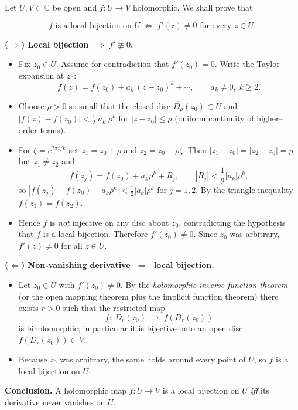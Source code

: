 \documentclass[12pt]{article}
\newcommand{\C}{\mathbb{C}}
\begin{document}
\begin{newproof}
  Let $U,V \subset \C$ be open and $f:U\to V$ holomorphic.  
  We shall prove that  

  $$
     f \text{ is a local bijection on }U 
     \;\Longleftrightarrow\;
     f'(z)\neq0 \text{ for every }z\in U .
  $$

  \smallskip
  \textbf{($\Rightarrow$)  Local bijection $\;\Longrightarrow\; f'\not\equiv0$.}

  \begin{itemize}
    \item Fix $z_0\in U$.  
          Assume for contradiction that $f'(z_0)=0$.  
          Write the Taylor expansion at $z_0$:
          $$
            f(z)=f(z_0)+a_k\,(z-z_0)^k+\cdots ,
            \qquad 
            a_k\neq0,\; k\ge2 .
          $$
    \item Choose $\rho>0$ so small that the closed disc
          $\overline{D_\rho}(z_0)\subset U$ and  
          $|f(z)-f(z_0)|<\tfrac12|a_k|\rho^k$ for $|z-z_0|\le\rho$ 
          (uniform continuity of higher–order terms).
    \item For $\zeta=e^{2\pi i/k}$ set  
          $z_1=z_0+\rho$ and $z_2=z_0+\rho\zeta$.  
          Then $|z_1-z_0|=|z_2-z_0|=\rho$ but $z_1\neq z_2$ and
          $$
            f(z_j)=f(z_0)+a_k\rho^k+R_j,\qquad |R_j|<\frac12|a_k|\rho^k ,
          $$
          so $|f(z_j)-f(z_0)-a_k\rho^k|<\frac12|a_k|\rho^k$ for $j=1,2$.  
          By the triangle inequality $f(z_1)=f(z_2)$.
    \item Hence $f$ is \emph{not} injective on any disc about $z_0$, contradicting the hypothesis that $f$ is a local bijection.
          Therefore $f'(z_0)\neq0$.  Since $z_0$ was arbitrary, $f'(z)\neq0$ for all $z\in U$.
  \end{itemize}

  \smallskip
  \textbf{($\Leftarrow$)  Non‑vanishing derivative $\;\Longrightarrow\;$ local bijection.}

  \begin{itemize}
    \item Let $z_0\in U$ with $f'(z_0)\neq0$.  
          By the \emph{holomorphic inverse function theorem} (or the open mapping theorem plus the implicit function theorem)
          there exists $r>0$ such that the restricted map
          $$
            f:\; D_r(z_0)\;\longrightarrow\; f(D_r(z_0))
          $$
          is biholomorphic; in particular it is bijective onto an open disc $f(D_r(z_0))\subset V$.
    \item Because $z_0$ was arbitrary, the same holds around every point of $U$, so $f$ is a local bijection on $U$.
  \end{itemize}

  \smallskip
  \textbf{Conclusion.}  
  A holomorphic map $f:U\to V$ is a local bijection on $U$ \emph{iff} its derivative never vanishes on $U$.
\end{newproof}
\end{document}
